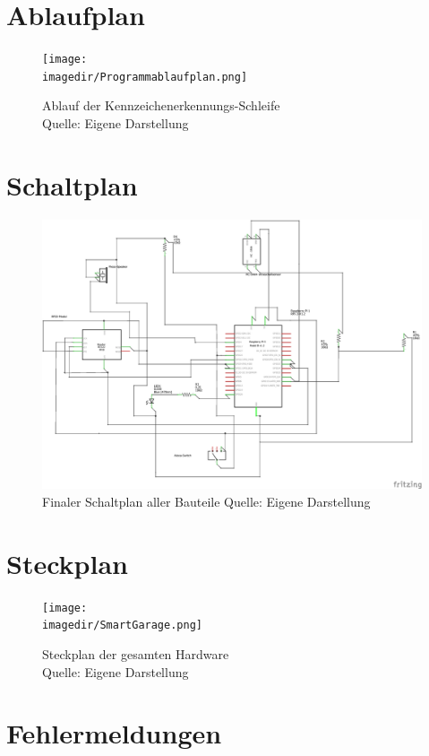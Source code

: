 \chapter{Ablaufplan}
\begin{figure}[H]
	\centering 
	\texttt{[image: \\imagedir/Programmablaufplan.png]}
	\captionsetup{format=hang}
	\caption[Programmablauf]{\label{Ablaufplan}Ablauf der Kennzeichenerkennungs-Schleife \\Quelle: Eigene Darstellung}
\end{figure}
\chapter{Schaltplan}
\begin{figure}[h]
	\centering
	\includegraphics[width=1\linewidth]{img/SmartGarage_Schaltplan}
	\caption{Finaler Schaltplan aller Bauteile \newline Quelle: Eigene Darstellung}
	\label{Schaltplan}
\end{figure}

\chapter{Steckplan}
\begin{figure}[H]
	\centering 
	\label{Steckplan}
	\texttt{[image: \\imagedir/SmartGarage.png]}
	\captionsetup{format=hang}
	\caption[Steckplan]{Steckplan der gesamten Hardware \\Quelle: Eigene Darstellung}
\end{figure}
\chapter{Fehlermeldungen}
